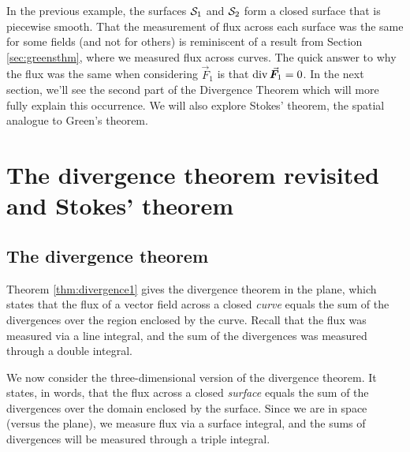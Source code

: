 In the previous example, the surfaces $\mathcal{S}_1$ and $\mathcal{S}_2$ form a closed surface that is piecewise smooth. That the measurement of flux across each surface was the same for some fields (and not for others) is reminiscent of a result from Section \ref{sec:greensthm}, where we measured flux across curves. The quick answer to why the flux was the same when considering $\vec F_1$ is that $\divv \vec F_1 = 0$. In the next section, we'll see the second part of the Divergence Theorem which will more fully explain this occurrence. We will also explore Stokes' theorem, the spatial analogue to Green's theorem.



\section{The divergence theorem revisited and Stokes' theorem}\label{div_stelling_3D_stokes}
\subsection{The divergence theorem}

\label{sec:stokes_divergence}


	\checkoddpage
{}
Theorem \ref{thm:divergence1} gives the divergence theorem in the plane, which states that the flux of a vector field across a closed \textit{curve} equals the sum of the divergences over the region enclosed by the curve. Recall that the flux was measured via a line integral, and the sum of the divergences was measured through a double integral.

We now consider the three-dimensional version of the divergence theorem. It states, in words, that the flux across a closed \textit{surface} equals the sum of the divergences over the domain enclosed by the surface. Since we are in space (versus the plane), we measure flux via a surface integral, and the sums of divergences will be measured through a triple integral.

